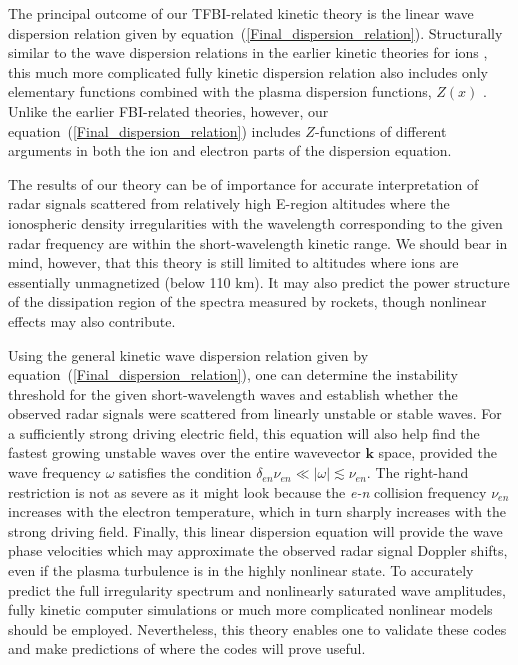 \documentclass[draft]{agujournal2019}
\renewcommand{\vec}{\mathbf}
\begin{document}
{The principal outcome of our TFBI-related kinetic theory is the linear wave dispersion relation given by
equation~(\ref{Final_dispersion_relation}). Structurally similar
to the wave dispersion relations in the earlier kinetic theories for ions
\cite{Farley:Plasma63,Lee:High-Frequency71,Schmidt:Density73,
Ossakow:Parallel75,Schlegel:Short83,Basu:Kinetic95}, this much more complicated fully kinetic
dispersion relation also includes only elementary functions combined with the
plasma dispersion functions, $Z(x)$ \cite{Fried:Plasma61}.
Unlike the earlier FBI-related theories, however, our equation~(\ref{Final_dispersion_relation}) 
includes $Z$-functions of different arguments in both the ion and
electron parts of the dispersion equation.

The results of our theory can be of importance for accurate interpretation of radar signals scattered from 
relatively high E-region altitudes where the ionospheric density irregularities with the wavelength 
corresponding to the given radar frequency are within the short-wavelength kinetic range. 
We should bear in mind, however, that this theory is still limited to altitudes where 
ions are essentially unmagnetized (below 110 km). It may also predict the power structure of the 
dissipation region of the spectra measured by rockets, though nonlinear effects may also contribute.

Using the general kinetic wave dispersion relation given by equation~(\ref{Final_dispersion_relation}), one can determine the 
instability threshold for the given short-wavelength waves and establish whether the observed 
radar signals were scattered from linearly unstable or stable waves. For a sufficiently strong 
driving electric field, this equation will also help find the 
fastest growing unstable waves over the entire wavevector $\vec{k}$ space, provided the wave frequency $\omega$ satisfies 
the condition $\delta_{en}\nu_{en}\ll |\omega| \lesssim \nu_{en}$. The right-hand restriction is 
not as severe as it might look because the \emph{e-n} collision frequency $\nu_{en}$ increases with the 
electron temperature, which in turn sharply increases with the strong driving field.
Finally, this linear dispersion equation will provide the wave phase velocities which may approximate the observed radar signal 
Doppler shifts, even if the plasma turbulence is in the highly nonlinear state. To accurately predict the 
full irregularity spectrum and nonlinearly saturated wave amplitudes, fully 
kinetic computer simulations or much more complicated nonlinear models should be employed. 
Nevertheless, this theory enables one to validate these codes and make predictions of where the codes will prove useful.


}
\end{document}
